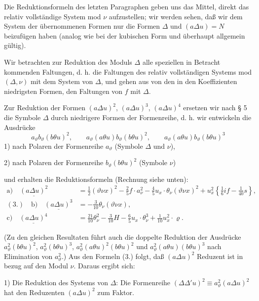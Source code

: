 Die Reduktionsformeln des letzten Paragraphen geben uns das Mittel, direkt das relativ vollständige System mod $\nu$ aufzustellen; wir werden sehen, daß wir dem System der übernommenen Formen nur die Formen $\Delta$ und $(a\Delta u)=N$ beizufügen haben (analog wie bei der kubischen Form und überhaupt allgemein gültig).

Wir betrachten zur Reduktion des Moduls $\Delta$ alle speziellen in Betracht kommenden Faltungen, d. h. die Faltungen des relativ vollständigen Systems mod $(\Delta,\nu)$ mit dem System von $\Delta$, und gehen aus von den in den Koeffizienten niedrigsten Formen, den Faltungen von $f$ mit $\Delta$.

Zur Reduktion der Formen $(a\Delta u)^2$, $(a\Delta u)^3$, $(a\Delta u)^4$ ersetzen wir nach § 5 die Symbole $\Delta$ durch niedrigere Formen der Formenreihe, d. h. wir entwickeln die Ausdrücke
\[
a_\vartheta b_\vartheta(b\theta u)^2,
\qquad a_\vartheta(a\theta u)b_\vartheta(b\theta u)^2,
\qquad a_\vartheta(a\theta u)b_\vartheta(b\theta u)^3
\]
1) nach Polaren der Formenreihe $a_\vartheta$ (Symbole $\Delta$ und $\nu$),

2) nach Polaren der Formenreihe $b_\vartheta(b\theta u)^2$ (Symbole $\nu$)

und erhalten die Reduktionsformeln (Rechnung siehe unten):
\[
\begin{aligned}
\text{a)}\quad \underline{(a\Delta u)^2}
&=\frac12(\vartheta \nu x)^2-\frac25f\cdot a_\nu^2
-\frac45u_x\cdot\theta_\nu(\vartheta \nu x)^2
+u_x^2\left\{\frac16i f-\frac1{40}s\right\},\\
(3.)\quad\text{b)}\quad \underline{(a\Delta u)^3}
&=-\frac3{10}\theta_\nu(\vartheta \nu x),\\
\text{c)}\quad \underline{(a\Delta u)^4}
&=\frac{21}{10}\theta_\nu^2-\frac3{10}H
-\frac65u_x\cdot\theta_\nu^3+\frac1{10}u_x^2\cdot\varrho.
\end{aligned}
\]

(Zu den gleichen Resultaten führt auch die doppelte Reduktion der Ausdrücke $a_\vartheta^2(b\theta u)^2$, $a_\vartheta^2(b\theta u)^3$, $a_\vartheta^2(a\theta u)^2(b\theta u)^2$ und $a_\vartheta^2(a\theta u)(b\theta u)^3$ nach Elimination von $a_\vartheta^2$.)
Aus den Formeln (3.) folgt, daß $(a\Delta u)^2$ Reduzent ist in bezug auf den Modul $\nu$. Daraus ergibt sich:

1) Die Reduktion des Systems von $\Delta$: Die Formenreihe $(\Delta\Delta' u)^2\equiv a_\vartheta^2(a\Delta u)^2$ hat den Reduzenten $(a\Delta u)^2$ zum Faktor.

